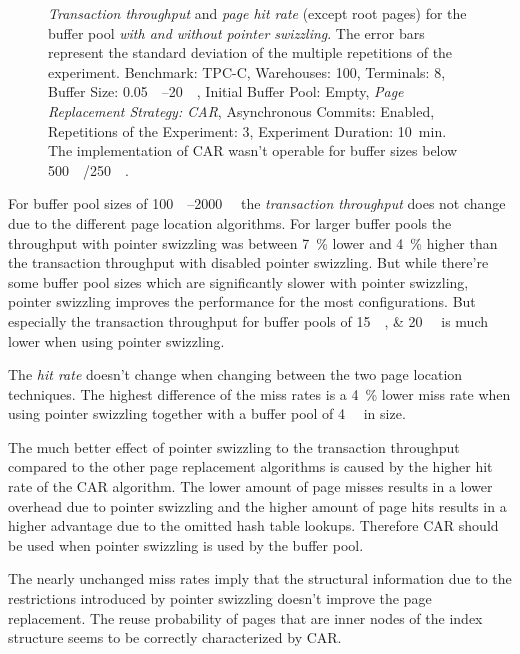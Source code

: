 \begin{@empty}
\begin{figure}[ht!]
{
		}
		\caption{\emph{Transaction throughput} and \emph{page hit rate} (except root pages) for the buffer pool \emph{with and without pointer swizzling}. The error bars represent the standard deviation of the multiple repetitions of the experiment. Benchmark: TPC-C, Warehouses: 100, Terminals: 8, Buffer Size: \SIrange{0.05}{20}{\gibi\byte}, Initial Buffer Pool: Empty, \emph{Page Replacement Strategy: CAR}, Asynchronous Commits: Enabled, Repetitions of the Experiment: 3, Experiment Duration: \SI{10}{\minute}. The implementation of CAR wasn't operable for buffer sizes below \SI{500}{\mebi\byte}/\SI{250}{\mebi\byte}.}
		\label{fig:carpagereplacement}
	\end{figure}
\end{@empty}

	For buffer pool sizes of \SIrange{100}{2000}{\mebi\byte} the \emph{transaction throughput} does not change due to the different page location algorithms. For larger buffer pools the throughput with pointer swizzling was between \SI{7}{\percent} lower and \SI{4}{\percent} higher than the transaction throughput with disabled pointer swizzling. But while there're some buffer pool sizes which are significantly slower with pointer swizzling, pointer swizzling improves the performance for the most configurations. But especially the transaction throughput for buffer pools of \SIlist{15;20}{\gibi\byte} is much lower when using pointer swizzling.
	
	The \emph{hit rate} doesn't change when changing between the two page location techniques. The highest difference of the miss rates is a \SI{4}{\percent} lower miss rate when using pointer swizzling together with a buffer pool of \SI{4}{\gibi\byte} in size.
	
	The much better effect of pointer swizzling to the transaction throughput compared to the other page replacement algorithms is caused by the higher hit rate of the CAR algorithm. The lower amount of page misses results in a lower overhead due to pointer swizzling and the higher amount of page hits results in a higher advantage due to the omitted hash table lookups. Therefore CAR should be used when pointer swizzling is used by the buffer pool.
	
	The nearly unchanged miss rates imply that the structural information due to the restrictions introduced by pointer swizzling doesn't improve the page replacement. The reuse probability of pages that are inner nodes of the index structure seems to be correctly characterized by CAR.

